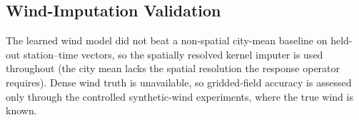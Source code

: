 \subsection{Wind-Imputation Validation}
\label{subsec:results_wind_imputation}
The learned wind model did not beat a non-spatial city-mean baseline on held-out
station--time vectors, so the spatially resolved kernel imputer is used throughout (the city mean lacks the
spatial resolution the response operator requires).  Dense wind truth is
unavailable, so gridded-field accuracy is assessed only through the controlled
synthetic-wind experiments, where the true wind is known.


